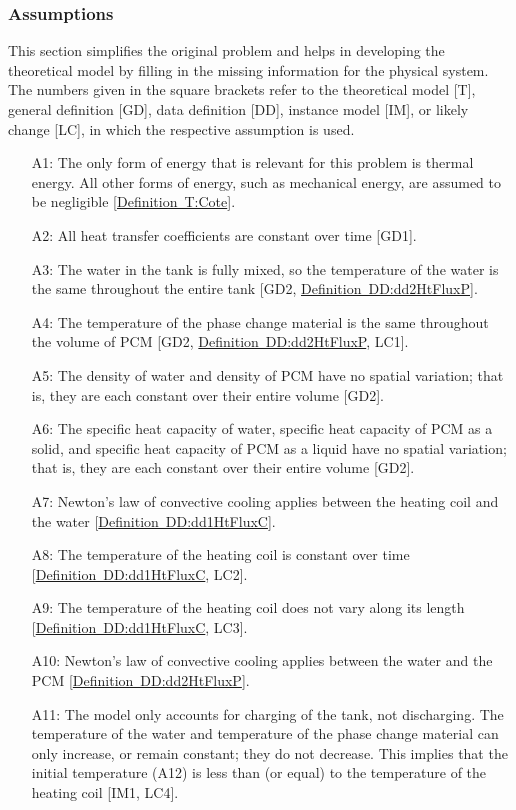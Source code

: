 \documentclass[12pt]{article}
\begin{document}
\subsubsection{Assumptions}
\label{Sec:A}
This section simplifies the original problem and helps in developing the theoretical model by filling in the missing information for the physical system. The numbers given in the square brackets refer to the theoretical model [T], general definition [GD], data definition [DD], instance model [IM], or likely change [LC], in which the respective assumption is used.
\begin{itemize}
\item[A1:]The only form of energy that is relevant for this problem is thermal energy. All other forms of energy, such as mechanical energy, are assumed to be negligible [\hyperref[T:Cote]{Definition~T:Cote}].
\item[A2:]All heat transfer coefficients are constant over time [GD1].
\item[A3:]The water in the tank is fully mixed, so the temperature of the water is the same throughout the entire tank [GD2, \hyperref[DD:dd2HtFluxP]{Definition~DD:dd2HtFluxP}].
\item[A4:]The temperature of the phase change material is the same throughout the volume of PCM [GD2, \hyperref[DD:dd2HtFluxP]{Definition~DD:dd2HtFluxP}, LC1].
\item[A5:]The density of water and density of PCM have no spatial variation; that is, they are each constant over their entire volume [GD2].
\item[A6:]The specific heat capacity of water, specific heat capacity of PCM as a solid, and specific heat capacity of PCM as a liquid have no spatial variation; that is, they are each constant over their entire volume [GD2].
\item[A7:]Newton's law of convective cooling applies between the heating coil and the water [\hyperref[DD:dd1HtFluxC]{Definition~DD:dd1HtFluxC}].
\item[A8:]The temperature of the heating coil is constant over time [\hyperref[DD:dd1HtFluxC]{Definition~DD:dd1HtFluxC}, LC2].
\item[A9:]The temperature of the heating coil does not vary along its length [\hyperref[DD:dd1HtFluxC]{Definition~DD:dd1HtFluxC}, LC3].
\item[A10:]Newton's law of convective cooling applies between the water and the PCM [\hyperref[DD:dd2HtFluxP]{Definition~DD:dd2HtFluxP}].
\item[A11:]The model only accounts for charging of the tank, not discharging. The temperature of the water and temperature of the phase change material can only increase, or remain constant; they do not decrease. This implies that the initial temperature (A12) is less than (or equal) to the temperature of the heating coil [IM1, LC4].

\end{itemize}
\end{document}
